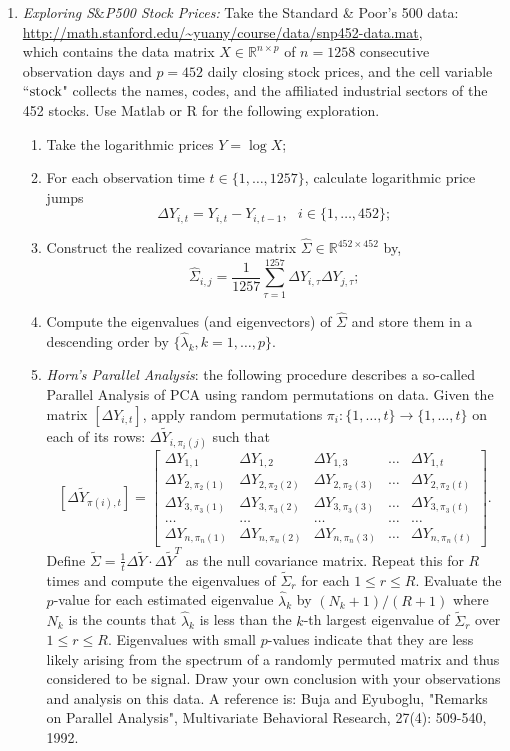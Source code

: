 \documentclass[11pt]{article}
\def\R{{\mathbb R}}
\begin{document}
\begin{enumerate}
\item {\em Exploring S$\&$P500 Stock Prices:} Take the Standard \& Poor's 500 data: \\
\url{http://math.stanford.edu/~yuany/course/data/snp452-data.mat},\\
which contains the data matrix $X\in \R^{n\times p}$ of $n=1258$ consecutive observation days and $p=452$ daily closing stock prices, and the cell variable ``${\rm stock}$" collects the names, codes, and the affiliated industrial sectors of the 452 stocks. Use Matlab or R for the following exploration. 
\begin{enumerate}
\item Take the logarithmic prices $Y=\log X$; 
\item For each observation time $t\in \{1,\ldots,1257\}$, calculate logarithmic price jumps
\[ \Delta Y_{i,t} = Y_{i,t} - Y_{i,{t-1}}, \ \ \ i\in \{ 1,\ldots, 452 \}; \]
\item Construct the realized covariance matrix $\hat{\Sigma}\in\R^{452\times 452}$ by,
\[ \hat{\Sigma}_{i,j} = \frac{1}{1257} \sum_{\tau =1}^{1257} \Delta Y_{i,\tau} \Delta Y_{j, \tau}; \]
\item Compute the eigenvalues (and eigenvectors) of $\hat{\Sigma}$ and store them in a descending order by $\{\hat{\lambda}_k, k=1,\ldots,p\}$. 
\item \emph{Horn's Parallel Analysis}: the following procedure describes a so-called Parallel Analysis of PCA using random permutations on data. Given the matrix $[\Delta Y_{i,t}]$, apply random permutations $\pi_i: \{1,\ldots,t\} \to \{1,\ldots, t\}$ on each of its rows: $\Delta \tilde{Y}_{i,\pi_i(j)}$ such that 
\[
[\Delta \tilde{Y}_{\pi(i),t}] = \left[
\begin{array}{ccccc}
\Delta Y_{1,1} & \Delta Y_{1,2} & \Delta Y_{1,3} & \ldots & \Delta Y_{1,t} \\
\Delta Y_{2,\pi_2(1)} & \Delta Y_{2,\pi_2(2)} & \Delta Y_{2,\pi_2(3)} & \ldots & \Delta Y_{2,\pi_2(t)} \\
\Delta Y_{3,\pi_3(1)} & \Delta Y_{3,\pi_3(2)} & \Delta Y_{3,\pi_3(3)} & \ldots & \Delta Y_{3,\pi_3(t)} \\
\ldots & \ldots & \ldots & \ldots & \ldots \\
\Delta Y_{n,\pi_n(1)} & \Delta Y_{n,\pi_n(2)} & \Delta Y_{n,\pi_n(3)} & \ldots & \Delta Y_{n,\pi_n(t)} 
\end{array}
\right].
\]
Define $\tilde{\Sigma} = \frac{1}{t} \Delta \tilde{Y} \cdot \Delta \tilde{Y}^T$ as the null covariance matrix. Repeat this for $R$ times and compute the eigenvalues of $\tilde{\Sigma}_r$ for each $1\leq r\leq R$. Evaluate the $p$-value for each estimated eigenvalue $\hat{\lambda}_k$ by $(N_k + 1)/(R+1)$ where $N_k$ is the counts that $\hat{\lambda}_k$ is less than the $k$-th largest eigenvalue of $\tilde{\Sigma}_r$ over $1\leq r \leq R$. Eigenvalues with small $p$-values indicate that they are less likely arising from the spectrum of a randomly permuted matrix and thus considered to be signal. Draw your own conclusion with your observations and analysis on this data. A reference is: Buja and Eyuboglu, "Remarks on Parallel Analysis", Multivariate Behavioral Research, 27(4): 509-540, 1992.

\end{enumerate}
\end{enumerate}
\end{document}
